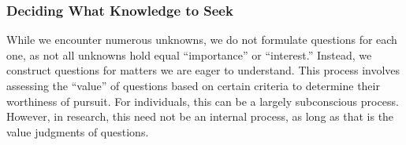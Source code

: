 


\subsubsection{Deciding What Knowledge to Seek}
\label{section-deciding-what-knowledge-to-seek}
While we encounter numerous unknowns, we do not formulate questions for each one, as not all unknowns hold equal ``importance'' or ``interest.'' Instead, we construct questions for matters we are eager to understand. This process involves assessing the ``value'' of questions based on certain criteria to determine their worthiness of pursuit. For individuals, this can be a largely subconscious process. However, in research, this need not be an internal process, as long as that is the value judgments of questions.


